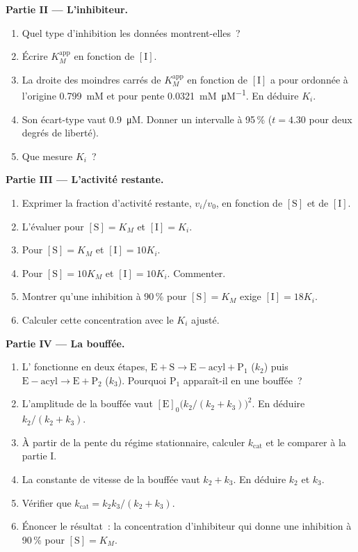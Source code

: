 \begin{problem}
\medskip\noindent\textbf{Partie II --- L'inhibiteur.}
\begin{enumerate}[resume]
  \item Quel type d'inhibition les données montrent-elles~?
  \item Écrire $K_M^{\mathrm{app}}$ en fonction de $[\mathrm I]$.
  \item La droite des moindres carrés de $K_M^{\mathrm{app}}$ en fonction
        de $[\mathrm I]$ a pour ordonnée à l'origine \qty{0.799}{mM} et
        pour pente \qty{0.0321}{mM.\micro M^{-1}}. En déduire $K_i$.
  \item Son écart-type vaut \qty{0.9}{\micro M}. Donner un intervalle à
        95\,\% ($t = 4.30$ pour
        deux degrés de liberté).
  \item Que mesure $K_i$~?
\end{enumerate}

\medskip\noindent\textbf{Partie III --- L'activité restante.}
\begin{enumerate}[resume]
  \item Exprimer la fraction d'activité restante, $v_i/v_0$, en fonction
        de $[\mathrm S]$ et de
        $[\mathrm I]$.
  \item L'évaluer pour $[\mathrm S] = K_M$ et $[\mathrm I] = K_i$.
  \item Pour $[\mathrm S] = K_M$ et $[\mathrm I] = 10K_i$.
  \item Pour $[\mathrm S] = 10K_M$ et $[\mathrm I] = 10K_i$. Commenter.
  \item Montrer qu'une inhibition à 90\,\% pour $[\mathrm S] = K_M$ exige
        $[\mathrm I] = 18K_i$.
  \item Calculer cette concentration avec le $K_i$ ajusté.
\end{enumerate}

\medskip\noindent\textbf{Partie IV --- La bouffée.}
\begin{enumerate}[resume]
  \item L' fonctionne en deux étapes, $\mathrm{E + S \to E{-}acyl + P_1}$ ($k_2$) puis $\mathrm{E{-}acyl \to E +
        P_2}$ ($k_3$). Pourquoi $\mathrm P_1$ apparaît-il en une
        bouffée~?
  \item L'amplitude de la bouffée vaut $[\mathrm E]_0\bigl(k_2/(k_2 + k_3)\bigr)^2$.
        En déduire $k_2/(k_2 + k_3)$.
  \item À partir de la pente du régime stationnaire, calculer
        $k_{\mathrm{cat}}$ et le comparer à la partie I.
  \item La constante de vitesse de la bouffée vaut $k_2 + k_3$. En
        déduire $k_2$ et $k_3$.
  \item Vérifier que $k_{\mathrm{cat}} = k_2k_3/(k_2 + k_3)$.
  \item Énoncer le résultat~: la concentration d'inhibiteur qui donne une
        inhibition à 90\,\% pour
        $[\mathrm S] = K_M$.
\end{enumerate}
\end{problem}
